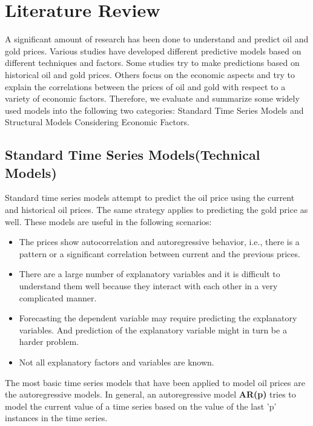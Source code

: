 \documentclass[runningheads]{llncs}
\begin{document}
\newpage

\section{Literature Review}
A significant amount of research has been done to understand and predict oil and gold prices. Various studies have developed different predictive models based on different techniques and factors. Some studies try to make predictions based on historical oil and gold prices. Others focus on the economic aspects and try to explain the correlations between the prices of oil and gold with respect to a variety of economic factors. Therefore, we evaluate and summarize some widely used models into the following two categories: Standard Time Series Models and Structural Models Considering Economic Factors.

\subsection{Standard Time Series Models(Technical Models)}
Standard time series models attempt to predict the oil price using the current and historical oil prices. The same strategy applies to predicting the gold price as well. These models are useful in the following scenarios:
\begin {itemize}
\item The prices show autocorrelation and autoregressive behavior, i.e., there is a pattern or a significant correlation between current and the previous prices.\\
\item There are a large number of explanatory variables and it is difficult to understand them well because they interact with each other in a very complicated manner. \\
\item Forecasting the dependent variable may require predicting the explanatory variables. And prediction of the explanatory variable might in turn be a harder problem.\\
\item Not all explanatory factors and variables are known.\\ 
\end {itemize}


\noindent The most basic time series models that have been applied to model oil prices are the autoregressive models. In general, an autoregressive model \textbf{AR(p)} tries to model the current value of a time series based on the value of the last 'p' instances in the time series.\\
\end{document}
